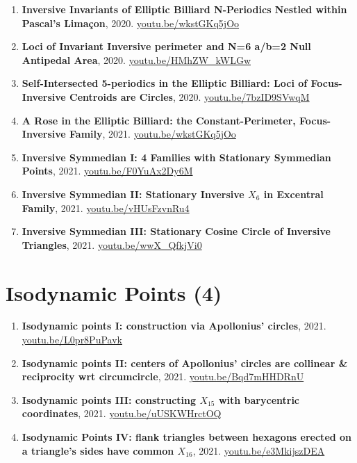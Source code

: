 \documentclass[12pt]{article}
\begin{document}
\begin{enumerate}[resume]
\item \textbf{Inversive Invariants of Elliptic Billiard N-Periodics Nestled within Pascal's Limaçon}, 2020. \href{https://youtu.be/wkstGKq5jOo}{\url{youtu.be/wkstGKq5jOo}}
\item \textbf{Loci of Invariant Inversive perimeter and N=6 a/b=2 Null Antipedal Area}, 2020. \href{https://youtu.be/HMhZW_kWLGw}{\url{youtu.be/HMhZW\_kWLGw}}
\item \textbf{Self-Intersected 5-periodics in the Elliptic Billiard: Loci of Focus-Inversive Centroids are Circles}, 2020. \href{https://youtu.be/7bzID9SVwqM}{\url{youtu.be/7bzID9SVwqM}}
\item \textbf{A Rose in the Elliptic Billiard: the Constant-Perimeter, Focus-Inversive Family}, 2021. \href{https://youtu.be/wkstGKq5jOo}{\url{youtu.be/wkstGKq5jOo}}
\item \textbf{Inversive Symmedian I: 4 Families with Stationary Symmedian Points}, 2021. \href{https://youtu.be/F0YuAx2Dy6M}{\url{youtu.be/F0YuAx2Dy6M}}
\item \textbf{Inversive Symmedian II: Stationary Inversive $X_{6}$ in Excentral Family}, 2021. \href{https://youtu.be/vHUsFzvnRu4}{\url{youtu.be/vHUsFzvnRu4}}
\item \textbf{Inversive Symmedian III: Stationary Cosine Circle of Inversive Triangles}, 2021. \href{https://youtu.be/wwX_QfkjVi0}{\url{youtu.be/wwX\_QfkjVi0}}
\end{enumerate}

\section{Isodynamic Points (4)}

\begin{enumerate}[resume]
\item \textbf{Isodynamic points I: construction via Apollonius' circles}, 2021. \href{https://youtu.be/L0pr8PuPavk}{\url{youtu.be/L0pr8PuPavk}}
\item \textbf{Isodynamic points II: centers of Apollonius' circles are collinear \& reciprocity wrt circumcircle}, 2021. \href{https://youtu.be/Bqd7mHHDRnU}{\url{youtu.be/Bqd7mHHDRnU}}
\item \textbf{Isodynamic points III: constructing $X_{15}$ with barycentric coordinates}, 2021. \href{https://youtu.be/uUSKWHrctOQ}{\url{youtu.be/uUSKWHrctOQ}}
\item \textbf{Isodynamic Points IV: flank triangles between hexagons erected on a triangle's sides have common $X_{16}$}, 2021. \href{https://youtu.be/e3MkijszDEA}{\url{youtu.be/e3MkijszDEA}}
\end{enumerate}
\end{document}
